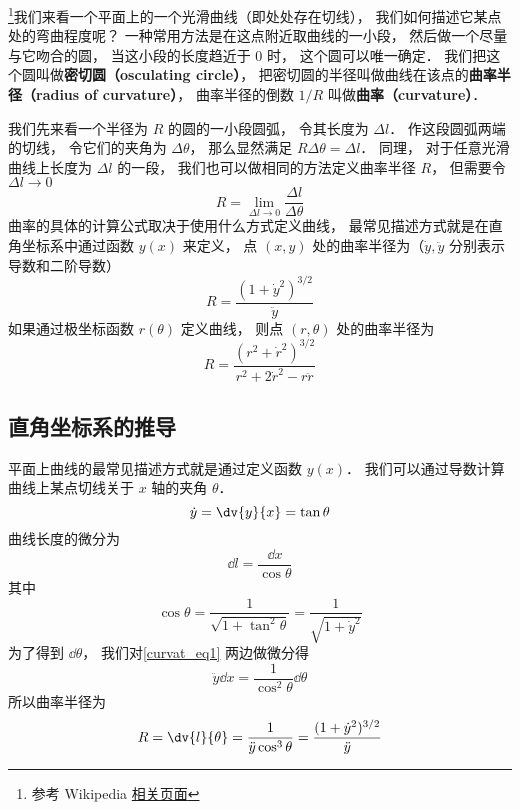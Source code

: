 

\footnote{参考 Wikipedia \href{https://en.wikipedia.org/wiki/Curvature}{相关页面}}我们来看一个平面上的一个光滑曲线（即处处存在切线）， 我们如何描述它某点处的弯曲程度呢？ 一种常用方法是在这点附近取曲线的一小段， 然后做一个尽量与它吻合的圆， 当这小段的长度趋近于 0 时， 这个圆可以唯一确定． 我们把这个圆叫做\textbf{密切圆（osculating circle）}， 把密切圆的半径叫做曲线在该点的\textbf{曲率半径（radius of curvature）}， 曲率半径的倒数 $1/R$ 叫做\textbf{曲率（curvature）}．

我们先来看一个半径为 $R$ 的圆的一小段圆弧， 令其长度为 $\Delta l$． 作这段圆弧两端的切线， 令它们的夹角为 $\Delta \theta$， 那么显然满足 $R \Delta\theta = \Delta l$． 同理， 对于任意光滑曲线上长度为 $\Delta l$ 的一段， 我们也可以做相同的方法定义曲率半径 $R$， 但需要令 $\Delta l \to 0$
\begin{equation}\label{curvat_eq3}
R = \lim_{\Delta l \to 0} \frac{\Delta l}{\Delta \theta}
\end{equation}
曲率的具体的计算公式取决于使用什么方式定义曲线， 最常见描述方式就是在直角坐标系中通过函数 $y(x)$ 来定义， 点 $(x, y)$ 处的曲率半径为（$\dot y, \ddot y$ 分别表示导数和二阶导数）
\begin{equation}
R = \frac{(1 + \dot y^2)^{3/2}}{\ddot y}
\end{equation}
如果通过极坐标函数 $r(\theta)$ 定义曲线， 则点 $(r, \theta)$ 处的曲率半径为
\begin{equation}
R = \frac{(r^2 + \dot r^2)^{3/2}}{r^2 + 2\dot r^2 - r\ddot r}
\end{equation}

\subsection{直角坐标系的推导}

平面上曲线的最常见描述方式就是通过定义函数 $y(x)$． 我们可以通过导数计算曲线上某点切线关于 $x$ 轴的夹角 $\theta$．
\begin{equation}\label{curvat_eq1}
\dot y = \dv{y}{x} = \tan \theta
\end{equation}
曲线长度的微分为
\begin{equation}
\dd{l} = \frac{\dd{x}}{\cos\theta}
\end{equation}
其中
\begin{equation}\label{curvat_eq2}
\cos\theta = \frac{1}{\sqrt{1 + \tan^2\theta}} = \frac{1}{\sqrt{1 + \dot y^2}}
\end{equation}
为了得到 $\dd{\theta}$， 我们对\autoref{curvat_eq1} 两边做微分得
\begin{equation}
\ddot y \dd{x} = \frac{1}{\cos^2\theta} \dd{\theta}
\end{equation}
所以曲率半径为
\begin{equation}
R = \dv{l}{\theta} = \frac{1}{\ddot y\cos^3\theta} = \frac{(1 + \dot y^2)^{3/2}}{\ddot y}
\end{equation}

